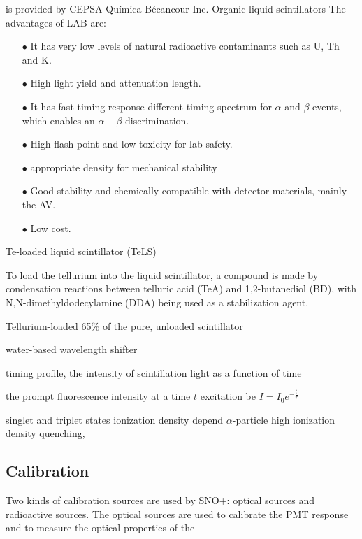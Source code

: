 is provided by CEPSA Qu\'{i}mica B\'ecancour Inc.
Organic liquid scintillators 
The advantages of LAB are:

\begin{itemize}
	\item[$\bullet$] It has very low levels of natural radioactive contaminants such as U, Th and K.
	\item[$\bullet$] High light yield and attenuation length.
	\item[$\bullet$] It has fast timing response 
	different timing spectrum for $\alpha$ and $\beta$ events, which enables an $\alpha-\beta$ discrimination. 
	\item[$\bullet$] High flash point and low toxicity for lab safety.
	\item[$\bullet$] appropriate density for mechanical stability
	\item[$\bullet$] Good stability and chemically compatible with detector materials, mainly the AV.
	\item[$\bullet$] Low cost.
\end{itemize}


Te-loaded liquid scintillator (TeLS)

To load the tellurium into the liquid scintillator, a compound is made by 
condensation reactions between telluric acid (TeA) and 1,2-butanediol (BD), with N,N-dimethyldodecylamine (DDA) being used as a stabilization agent.






Tellurium-loaded 65\% of the pure, unloaded scintillator



water-based wavelength shifter


timing profile, the intensity of scintillation light as a function of time

the prompt fluorescence intensity at a time $t$ excitation be $I=I_0e^{-\frac{t}{\tau}}$



singlet and triplet states 
ionization density 
depend
$\alpha$-particle
high ionization density 
quenching, 


\subsection{Calibration}


Two kinds of calibration sources are used by SNO+: optical sources and radioactive sources. 
The optical sources are used to calibrate the PMT response and to measure the optical properties of the 


